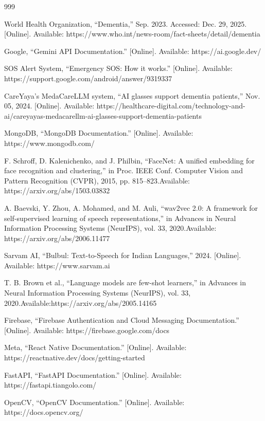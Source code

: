 \begin{thebibliography}{999}
\raggedright

World Health Organization,
 “Dementia,” Sep. 2023. Accessed: Dec. 29, 2025.
 [Online]. Available: https://www.who.int/news-room/fact-sheets/detail/dementia


Google,
 “Gemini API Documentation.”
 [Online]. Available: https://ai.google.dev/

SOS Alert System,
 “Emergency SOS: How it works.”
 [Online]. Available: https://support.google.com/android/answer/9319337

CareYaya’s MedaCareLLM system,
 “AI glasses support dementia patients,” Nov. 05, 2024.
 [Online]. Available: https://healthcare-digital.com/technology-and-ai/careyayas-medacarellm-ai-glasses-support-dementia-patients

MongoDB,
 “MongoDB Documentation.”
 [Online]. Available: https://www.mongodb.com/



F. Schroff, D. Kalenichenko, and J. Philbin,
 ``FaceNet: A unified embedding for face recognition and clustering,''
 in Proc. IEEE Conf. Computer Vision and Pattern Recognition (CVPR), 2015, pp. 815--823.Available: https://arxiv.org/abs/1503.03832

A. Baevski, Y. Zhou, A. Mohamed, and M. Auli,
 ``wav2vec 2.0: A framework for self-supervised learning of speech representations,''
 in Advances in Neural Information Processing Systems (NeurIPS), vol. 33, 2020.Available: https://arxiv.org/abs/2006.11477

Sarvam AI,
 ``Bulbul: Text-to-Speech for Indian Languages,'' 2024.
 [Online]. Available: https://www.sarvam.ai

T. B. Brown et al.,
 ``Language models are few-shot learners,''
 in Advances in Neural Information Processing Systems (NeurIPS), vol. 33, 2020.Available:https://arxiv.org/abs/2005.14165

Firebase,
 ``Firebase Authentication and Cloud Messaging Documentation.''
 [Online]. Available: https://firebase.google.com/docs

Meta,
 ``React Native Documentation.''
 [Online]. Available: https://reactnative.dev/docs/getting-started

FastAPI,
 ``FastAPI Documentation.''
 [Online]. Available: https://fastapi.tiangolo.com/

OpenCV,
 ``OpenCV Documentation.''
 [Online]. Available: https://docs.opencv.org/

\end{thebibliography}